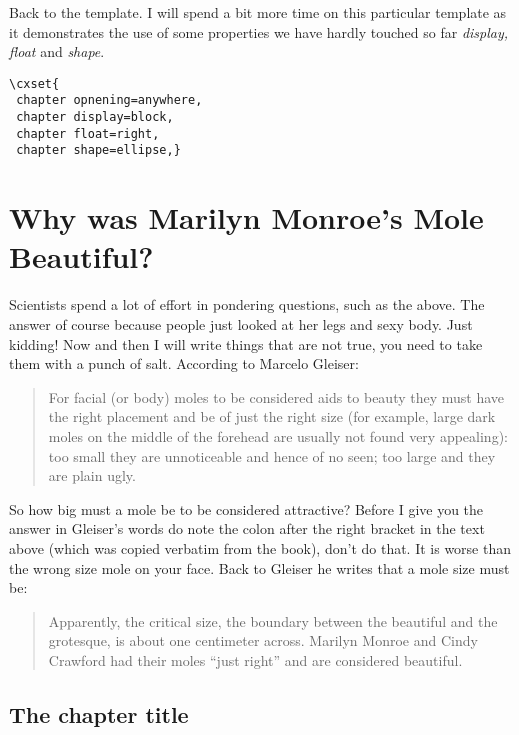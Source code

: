 Back to the template. I will spend a bit more time on this particular template as it demonstrates the use of some properties we have hardly touched so far  \emph{display, float} and \emph{shape}.

\begin{verbatim}
\cxset{
 chapter opnening=anywhere,
 chapter display=block,
 chapter float=right,
 chapter shape=ellipse,}
\end{verbatim}

          
\chapter{Why was Marilyn Monroe’s Mole Beautiful?}

Scientists spend a lot of effort in pondering questions, such as the above. The answer of course because 
people just looked at her legs and sexy body. Just kidding! Now and then I will write things that are not true, you need to take them with a punch of salt. According to Marcelo Gleiser:

\begin{quotation}
For facial (or body) moles to be considered aids to beauty they must have the right placement and be of just the right size (for example, large dark moles on the middle of the forehead are usually not found very appealing): too small they are unnoticeable and hence of no seen; too large and they are plain ugly. 
\end{quotation}

So how big must a mole be to be considered attractive? Before I give you the answer in Gleiser’s words do note the colon after the right bracket in the text above (which was copied verbatim from the book), don’t do that. It is worse than the wrong size mole on your face. Back to Gleiser he writes that a mole size must be:

\begin{quotation}
Apparently, the critical size, the boundary between the beautiful and the grotesque, is about one centimeter across. Marilyn Monroe and Cindy Crawford had their moles “just right” and are considered beautiful. 
\end{quotation}


\section{The chapter title}

